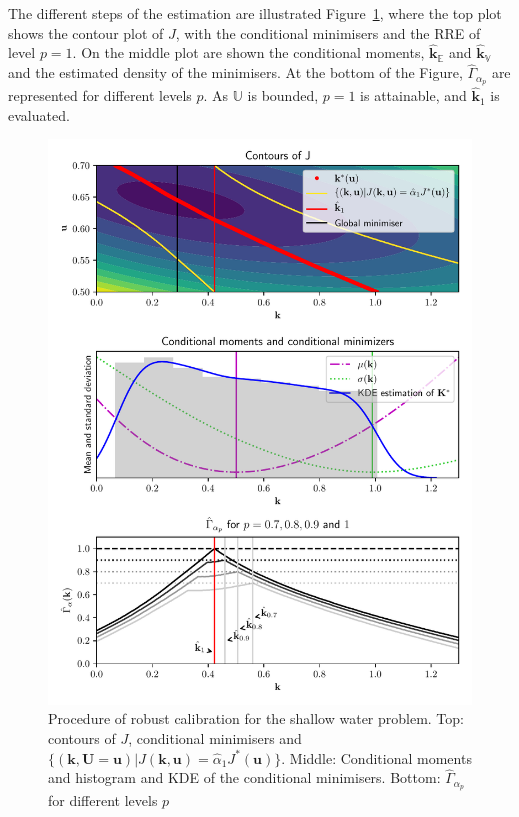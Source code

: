 \documentclass[preprint, review, 1p]{elsarticle}
\newcommand{\Ex}{\mathbb{E}}
\newcommand{\hatkmean}{\hat{\mathbf{k}}_{\Ex}}
\newcommand{\hatkvar}{\hat{\mathbf{k}}_{\mathbb{V}}}
\newcommand{\kest}{\hat{\mathbf{k}}}
\newcommand{\RRE}{RRE}
\newcommand{\Uspace}{\mathbb{U}}
\newlength{\singlecolumnsize}
\begin{document}
The different steps of the estimation are illustrated Figure~\ref{fig:estimation_swe}, where the top plot shows the contour plot of $J$, with the conditional minimisers and the \RRE{} of level $p=1$. On the middle plot are shown the conditional moments, $\hatkmean$ and $\hatkvar$ and the estimated density of the minimisers. At the bottom of the Figure, $\hat{\Gamma}_{\alpha_p}$ are represented for different levels $p$. As $\Uspace$ is bounded, $p=1$ is attainable, and $\kest_1$ is evaluated.

\begin{figure}[!h]
\centering
\includegraphics[width=\singlecolumnsize]{Figures/FIG10.pdf}
\caption{Procedure of robust calibration for the shallow water problem. Top: contours of $J$, conditional minimisers and $\{(\mathbf{k},\mathbf{U}=\mathbf{u}) | J(\mathbf{k},\mathbf{u}) = \hat{\alpha}_1 J^*(\mathbf{u})\}$. Middle: Conditional moments and histogram and KDE of the conditional minimisers. Bottom: $\hat{\Gamma}_{\alpha_p}$ for different levels $p$}
\label{fig:estimation_swe}
\end{figure}
\end{document}
